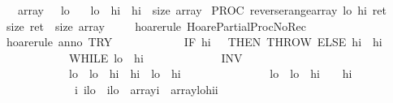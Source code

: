\begin{isabellebody}
{\isachardoublequoteopen}{\isasymforall}{\isasymsigma}{\isachardot}\ {\isasymGamma}{\isasymturnstile}\ {\isasymlbrace}{\isasymsigma}{\isachardot}\ {\isacharparenleft}{\isasymacute}array\ {\isasymnoteq}\ {\isacharbrackleft}{\isacharbrackright}{\isacharparenright}\ {\isasymand}{\isacharparenleft}{\isasymacute}lo\ {\isasymge}\ {}{\isacharparenright}\ {\isasymand}\isanewline
{\isacharparenleft}{\isasymacute}lo\ {\isasymle}\ {\isasymacute}hi{\isacharparenright}\ {\isasymand}\ {\isacharparenleft}{\isasymacute}hi\ {\isasymle}\ size\ {\isasymacute}array{\isacharparenright}\ {\isasymrbrace}\isanewline
PROC\ reverse{\isacharunderscore}range{\isacharparenleft}{\isasymacute}array{\isacharcomma}\ {\isasymacute}lo{\isacharcomma}\ {\isasymacute}hi{\isacharcomma}\ {\isasymacute}ret{\isacharparenright}\isanewline
{\isasymlbrace}\ {\isacharparenleft}size\ {\isasymacute}ret\ {\isacharequal}\ size\ \isactrlbsup {\isasymsigma}\isactrlesup array{\isacharparenright}\ {\isasymrbrace}\isanewline
{\isachardoublequoteclose}\isanewline
%
\isadelimproof
\ \ %
\endisadelimproof
%
\isatagproof
{}\isamarkupfalse%
\ {\isacharparenleft}hoare{\isacharunderscore}rule\ HoarePartial{\isachardot}ProcNoRec{}{\isacharparenright}\isanewline
\ \ \isamarkupfalse%
\ {\isacharparenleft}hoare{\isacharunderscore}rule\ anno{\isacharequal}\ {\isachardoublequoteopen}TRY\isanewline
\ \ \ \ \ \ \ \ \ \ \ \ IF\ {\isasymacute}hi\ {\isacharequal}\ {}\ THEN\ THROW\ ELSE\ {\isasymacute}hi\ {\isacharcolon}{\isacharequal}{\isacharequal}\ {\isasymacute}hi\ {\isacharminus}\ {}{\isacharsemicolon}{\isacharsemicolon}\isanewline
\ \ \ \ \ \ \ \ \ \ \ \ WHILE\ {\isasymacute}lo\ {\isacharless}\ {\isasymacute}hi\ \isanewline
\ \ \ \ \ \ \ \ \ \ \ \ INV\ {\isasymlbrace}\ \ \isanewline
\ \ \ \ \ \ \ \ \ \ \ \ {\isacharparenleft}\isactrlbsup {\isasymsigma}\isactrlesup lo\ {\isasymle}\ {\isasymacute}lo{\isacharparenright}\ {\isasymand}\ {\isacharparenleft}\isactrlbsup {\isasymsigma}\isactrlesup hi\ {\isachargreater}\ {\isasymacute}hi{\isacharparenright}\ {\isasymand}\ {\isacharparenleft}{\isasymacute}lo\ {\isasymle}\ {\isasymacute}hi\ {\isacharplus}\ {}{\isacharparenright}\ {\isasymand}\isanewline
\ \ \ \ \ \ \ \ \ \ \ \ {\isacharparenleft}{\isasymacute}lo\ {\isacharminus}\ \isactrlbsup {\isasymsigma}\isactrlesup lo\ {\isacharequal}\ \isactrlbsup {\isasymsigma}\isactrlesup hi\ {\isacharminus}\ {}\ {\isacharminus}\ {\isasymacute}hi{\isacharparenright}\ {\isasymand}\isanewline
\ \ \ \ \ \ \ \ \ \ \ \ {\isacharparenleft}\ {\isasymforall}i{\isachardot}\ i{\isasymge}\isactrlbsup {\isasymsigma}\isactrlesup lo\ {\isasymand}\ i{\isacharless}{\isasymacute}lo\ {\isasymlongrightarrow}\ {\isasymacute}array{\isacharbang}i\ {\isacharequal}\ \isactrlbsup {\isasymsigma}\isactrlesup array{\isacharbang}{\isacharparenleft}\isactrlbsup {\isasymsigma}\isactrlesup lo{\isacharplus}\isactrlbsup {\isasymsigma}\isactrlesup hi{\isacharminus}i{\isacharminus}{}{\isacharparenright}{\isacharparenright}\ {\isasymand}\isanewline

\end{isabellebody}
